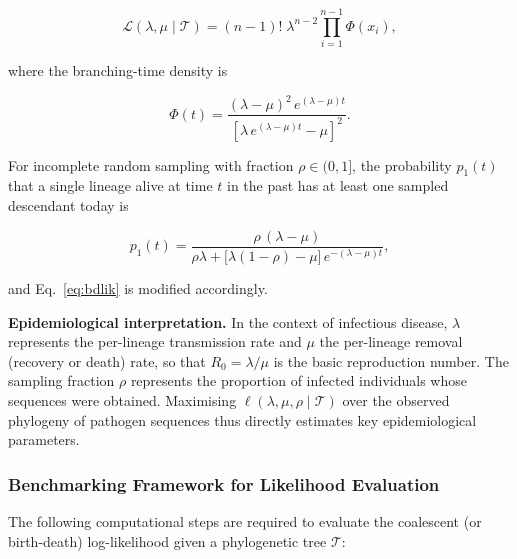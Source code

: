 \documentclass[11pt, a4paper]{article}
\begin{document}
\begin{equation}
    \mathcal{L}(\lambda, \mu \mid \mathcal{T})
    = (n-1)!\;\lambda^{n-2}
      \prod_{i=1}^{n-1} \Phi(x_i),
    \label{eq:bdlik}
\end{equation}

where the branching-time density is

\begin{equation}
    \Phi(t) = \frac{(\lambda - \mu)^2\,e^{(\lambda-\mu)t}}
               {\left[\lambda\,e^{(\lambda-\mu)t} - \mu\right]^2}.
    \label{eq:phi}
\end{equation}

For incomplete random sampling with fraction $\rho \in (0,1]$, the probability
$p_1(t)$ that a single lineage alive at time $t$ in the past has at least one
sampled descendant today is

\begin{equation}
    p_1(t) = \frac{\rho\,(\lambda - \mu)}
              {\rho\lambda + \bigl[\lambda(1-\rho) - \mu\bigr]\,e^{-(\lambda-\mu)t}},
    \label{eq:p1}
\end{equation}

and Eq.~\eqref{eq:bdlik} is modified accordingly.

\medskip
\noindent\textbf{Epidemiological interpretation.}
In the context of infectious disease, $\lambda$ represents the per-lineage transmission
rate and $\mu$ the per-lineage removal (recovery or death) rate, so that
$R_0 = \lambda/\mu$ is the basic reproduction number. The sampling fraction $\rho$
represents the proportion of infected individuals whose sequences were obtained.
Maximising $\ell(\lambda, \mu, \rho \mid \mathcal{T})$ over the observed phylogeny
of pathogen sequences thus directly estimates key epidemiological parameters.

\subsubsection{Benchmarking Framework for Likelihood Evaluation}

The following computational steps are required to evaluate the coalescent (or
birth-death) log-likelihood given a phylogenetic tree $\mathcal{T}$:
\end{document}
